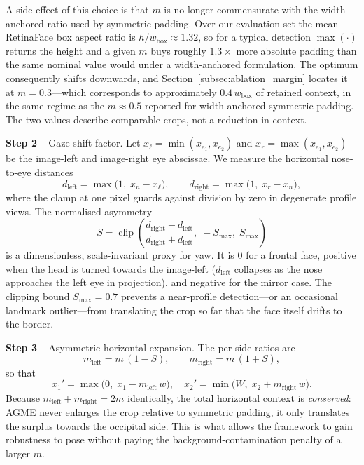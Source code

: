 \documentclass[journal]{IEEEtran}
\begin{document}
A side effect of this choice is that $m$ is no longer commensurate with the width-anchored ratio used by symmetric padding. Over our evaluation set the mean RetinaFace box aspect ratio is $h/w_{\text{box}} \approx 1.32$, so for a typical detection $\max(\cdot)$ returns the height and a given $m$ buys roughly $1.3\times$ more absolute padding than the same nominal value would under a width-anchored formulation. The optimum consequently shifts downwards, and Section~\ref{subsec:ablation_margin} locates it at $m = 0.3$---which corresponds to approximately $0.4\,w_{\text{box}}$ of retained context, in the same regime as the $m \approx 0.5$ reported for width-anchored symmetric padding. The two values describe comparable crops, not a reduction in context.

\textbf{Step 2} -- Gaze shift factor. Let $x_{\ell} = \min(x_{e_1}, x_{e_2})$ and $x_{r} = \max(x_{e_1}, x_{e_2})$ be the image-left and image-right eye abscissae. We measure the horizontal nose-to-eye distances
\begin{equation}
d_{\text{left}} = \max\!\big(1,\; x_{n} - x_{\ell}\big), \qquad
d_{\text{right}} = \max\!\big(1,\; x_{r} - x_{n}\big),
\label{eq:dleftright}
\end{equation}
where the clamp at one pixel guards against division by zero in degenerate profile views. The normalised asymmetry
\begin{equation}
S = \operatorname{clip}\!\left(\frac{d_{\text{right}} - d_{\text{left}}}{d_{\text{right}} + d_{\text{left}}},\; -S_{\max},\; S_{\max}\right)
\label{eq:shift}
\end{equation}
is a dimensionless, scale-invariant proxy for yaw. It is $0$ for a frontal face, positive when the head is turned towards the image-left ($d_{\text{left}}$ collapses as the nose approaches the left eye in projection), and negative for the mirror case. The clipping bound $S_{\max} = 0.7$ prevents a near-profile detection---or an occasional landmark outlier---from translating the crop so far that the face itself drifts to the border.

\textbf{Step 3} -- Asymmetric horizontal expansion. The per-side ratios are
\begin{equation}
m_{\text{left}} = m\,(1 - S), \qquad m_{\text{right}} = m\,(1 + S),
\label{eq:msplit}
\end{equation}
so that
\begin{equation}
x_1' = \max\!\big(0,\; x_1 - m_{\text{left}}\, w\big), \quad
x_2' = \min\!\big(W,\; x_2 + m_{\text{right}}\, w\big).
\label{eq:hexpand}
\end{equation}
Because $m_{\text{left}} + m_{\text{right}} = 2m$ identically, the total horizontal context is \textit{conserved}: AGME never enlarges the crop relative to symmetric padding, it only translates the surplus towards the occipital side. This is what allows the framework to gain robustness to pose without paying the background-contamination penalty of a larger $m$.
\end{document}

